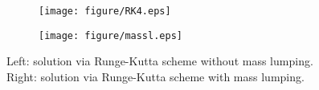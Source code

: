 \documentclass[preprint,12pt]{elsarticle}
\begin{document}
 \begin{figure}[htbp]
    \centering
    \begin{subfigure}{0.45\textwidth}
        \texttt{[image: figure/RK4.eps]}
        \caption{}
        \label{fig:image210}
    \end{subfigure}
    \begin{subfigure}{0.45\textwidth}
        \texttt{[image: figure/massl.eps]}
        \caption{}
        \label{fig:image220}
    \end{subfigure}
    \caption{Left: solution via Runge-Kutta scheme without mass lumping. Right: solution via Runge-Kutta scheme with mass lumping.}
    \label{fig:m0l}
\end{figure}

\end{document}
